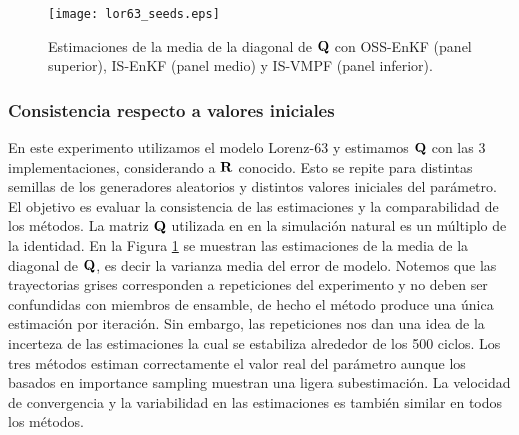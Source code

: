 \begin{figure}[h]
    \centering
    \texttt{[image: lor63\_seeds.eps]}
    \caption{Estimaciones de la media de la diagonal de $\mathbf{Q}$ con OSS-EnKF (panel superior), IS-EnKF (panel medio) y IS-VMPF (panel inferior).}
    \label{fig:lor63_seeds}
\end{figure}

\subsubsection{Consistencia respecto a valores iniciales}
En este experimento utilizamos el modelo Lorenz-63 y estimamos $\mathbf{Q}$ con las 3 implementaciones, considerando a $\mathbf{R}$ conocido. Esto se repite para distintas semillas de los generadores aleatorios y distintos valores iniciales del parámetro. El objetivo es evaluar la consistencia de las estimaciones y la comparabilidad de los métodos. La matriz $\mathbf{Q}$ utilizada en en la simulación natural es un múltiplo de la identidad. En la Figura \ref{fig:lor63_seeds} se muestran las estimaciones de la media de la diagonal de $\mathbf{Q}$, es decir la varianza media del error de modelo. Notemos que las trayectorias grises corresponden a repeticiones del experimento y no deben ser confundidas con miembros de ensamble, de hecho el método produce una única estimación por iteración. Sin embargo, las repeticiones nos dan una idea de la incerteza de las estimaciones la cual se estabiliza alrededor de los 500 ciclos. Los tres métodos estiman correctamente el valor real del parámetro aunque los basados en importance sampling muestran una ligera subestimación. La velocidad de convergencia y la variabilidad en las estimaciones es también similar en todos los métodos.

